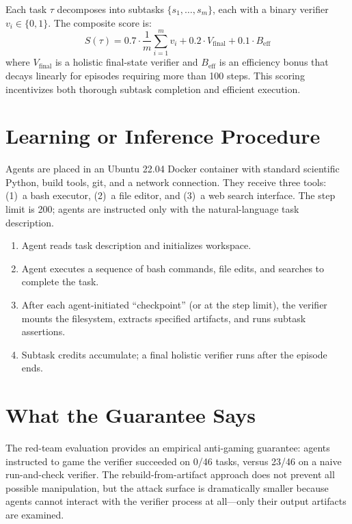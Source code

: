 \documentclass[10pt,twocolumn]{article}
\begin{document}
Each task $\tau$ decomposes into subtasks $\{s_1, \ldots, s_m\}$,
each with a binary verifier $v_i \in \{0, 1\}$. The composite score is:
\[
S(\tau) = 0.7 \cdot \frac{1}{m}\sum_{i=1}^m v_i
  + 0.2 \cdot V_{\text{final}}
  + 0.1 \cdot B_{\text{eff}}
\]
where $V_{\text{final}}$ is a holistic final-state verifier and
$B_{\text{eff}}$ is an efficiency bonus that decays linearly for
episodes requiring more than 100 steps. This scoring incentivizes
both thorough subtask completion and efficient execution.

\section{Learning or Inference Procedure}

Agents are placed in an Ubuntu 22.04 Docker container with standard
scientific Python, build tools, git, and a network connection.
They receive three tools: (1)~a bash executor, (2)~a file editor,
and (3)~a web search interface. The step limit is 200; agents are
instructed only with the natural-language task description.

\begin{enumerate}[itemsep=2pt,parsep=0pt]
  \item Agent reads task description and initializes workspace.
  \item Agent executes a sequence of bash commands, file edits,
    and searches to complete the task.
  \item After each agent-initiated ``checkpoint'' (or at the step limit),
    the verifier mounts the filesystem, extracts specified artifacts,
    and runs subtask assertions.
  \item Subtask credits accumulate; a final holistic verifier runs
    after the episode ends.
\end{enumerate}

\section{What the Guarantee Says}

The red-team evaluation provides an empirical anti-gaming guarantee:
agents instructed to game the verifier succeeded on 0/46 tasks,
versus 23/46 on a naive run-and-check verifier. The rebuild-from-artifact
approach does not prevent all possible manipulation, but the attack
surface is dramatically smaller because agents cannot interact with
the verifier process at all---only their output artifacts are examined.
\end{document}
